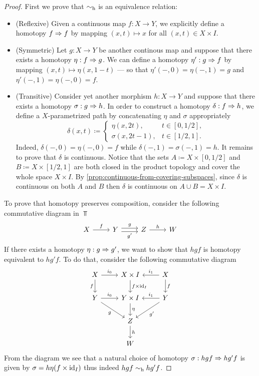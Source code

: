 \begin{proof}
First we prove that \(\sim_{\text{h}}\) is an equivalence relation:
\begin{itemize}\setlength\itemsep{0em}
\item (Reflexive) Given a continuous map \(f: X \to Y\), we explicitly define a
  homotopy \(f \Rightarrow f\) by mapping \((x, t) \mapsto x\) for all
  \((x, t) \in X \times I\).

\item (Symmetric) Let \(g: X \to Y\) be another continous map and suppose that
  there exists a homotopy \(\eta: f \Rightarrow g\). We can define a homotopy \(\eta':
  g \Rightarrow f\) by mapping \((x, t) \mapsto \eta(x, 1 - t)\) --- so that \(\eta'(-,
  0) = \eta(-, 1) = g\) and \(\eta'(-, 1) = \eta(-, 0) = f\).

\item (Transitive) Consider yet another morphism \(h: X \to Y\) and suppose that
  there exists a homotopy \(\sigma: g \Rightarrow h\). In order to construct a homotopy
  \(\delta: f \Rightarrow h\), we define a \(X\)-parametrized path by concatenating
  \(\eta\) and \(\sigma\) appropriately
  \[
  \delta(x, t) \coloneq
  \begin{cases}
    \eta(x, 2 t), & t \in [0, 1/2], \\
    \sigma(x, 2 t - 1), & t \in [1/2, 1].
  \end{cases}
  \]
  Indeed, \(\delta(-, 0) = \eta(-, 0) = f\) while
  \(\delta(-, 1) = \sigma(-, 1) = h\). It remains to prove that \(\delta\) is
  continuous. Notice that the sets \(A \coloneq X \times [0, 1/2]\) and
  \(B \coloneq X \times [1/2, 1]\) are both closed in the product topology and
  cover the whole space \(X \times I\). By
  \cref{prop:continuous-from-covering-subspaces}, since \(\delta\)
  is continuous on both \(A\) and \(B\) then \(\delta\) is continuous on
  \(A \cup B = X \times I\).
\end{itemize}
To prove that homotopy preserves composition, consider the following commutative
diagram in \(\Top\)
\[
\begin{tikzcd}
X \ar[r, "f"]
&Y \ar[r, shift left, "g"] \ar[r, shift right, "g'"']
&Z \ar[r, "h"]
&W
\end{tikzcd}
\]
If there exists a homotopy \(\eta: g \Rightarrow g'\), we want to show that \(h g f\)
is homotopy equivalent to \(h g' f\). To do that, consider the following
commutative diagram
\[
\begin{tikzcd}
X \ar[r, "i_0"] \ar[d, "f"']
&X \times I \ar[d, "f \times \Id_I"]
&X \ar[l, "i_1"'] \ar[d, "f"]
\\
Y \ar[r, "i_0"] \ar[dr, "g"']
&Y \times I \ar[d, "\eta"]
&Y \ar[l, "i_1"'] \ar[dl, "g'"]
\\
&Z \ar[d, "h"] &
\\
&W &
\end{tikzcd}
\]
From the diagram we see that a natural choice of homotopy
\(\sigma: h g f \Rightarrow h g' f\) is given by \(\sigma = h \eta (f \times \operatorname{id}_I)\)
thus indeed \(h g f \sim_{\text{h}} h g' f\).
\end{proof}


